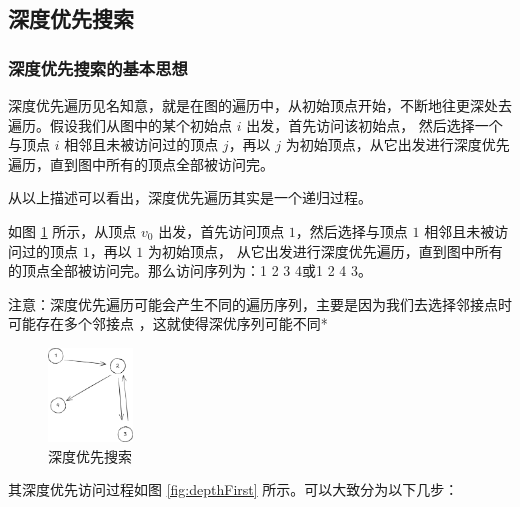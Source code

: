 \documentclass[lang=cn,newtx,10pt,scheme=chinese]{../elegantbook}
\begin{document}
\subsection{深度优先搜索}

\subsubsection{深度优先搜索的基本思想}
深度优先遍历见名知意，就是在图的遍历中，从初始顶点开始，不断地往更深处去遍历。假设我们从图中的某个初始点 $i$ 出发，首先访问该初始点，
然后选择一个与顶点 $i$ 相邻且未被访问过的顶点 $j$，再以 $j$ 为初始顶点，从它出发进行深度优先遍历，直到图中所有的顶点全部被访问完。

从以上描述可以看出，深度优先遍历其实是一个递归过程。

如图 \ref{fig:DFS} 所示，从顶点 $v_0$ 出发，首先访问顶点 $1$，然后选择与顶点 $1$ 相邻且未被访问过的顶点 $1$，再以 $1$ 为初始顶点，
从它出发进行深度优先遍历，直到图中所有的顶点全部被访问完。那么访问序列为：1 2 3 4或1 2 4 3。

注意：深度优先遍历可能会产生不同的遍历序列，主要是因为我们去选择邻接点时可能存在多个邻接点 ，这就使得深优序列可能不同*

\begin{figure}[!htbp]
  \centering
  \includegraphics[width=0.2\textwidth]{./figure/pdf/cropped/depthFirstGraph.pdf}
  \caption{深度优先搜索}
  \label{fig:DFS}
\end{figure}

其深度优先访问过程如图 \ref{fig:depthFirst} 所示。可以大致分为以下几步：
\end{document}
